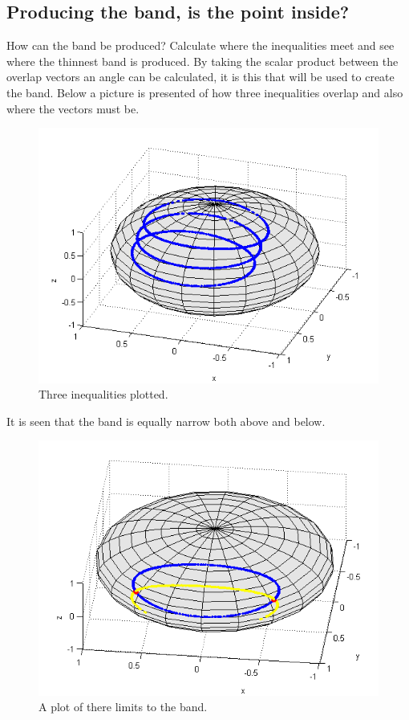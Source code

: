 \subsection{Producing the band, is the point inside?}
How can the band be produced?
Calculate where the inequalities meet and see where the thinnest band is produced. By taking the scalar product between the overlap vectors an angle can be calculated, it is  this that will be used to create the band. Below a picture is presented of how three inequalities overlap and also where the vectors must be. 
\begin{figure}[H]
\begin{center}
\includegraphics[scale=0.5]{overlap114.png}
\caption{Three inequalities plotted.}
\label{fig:overlap114}
\end{center}
\end{figure}
It is seen that the band is equally narrow both above and below. 
\begin{figure}[H]
\begin{center}
\includegraphics[scale=0.5]{band.png}
\caption{A plot of there limits to the band.}
\label{fig:band}
\end{center}
\end{figure}
